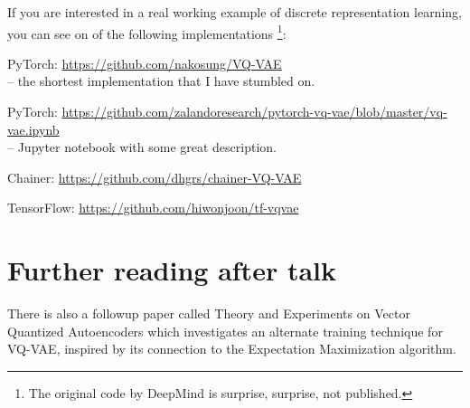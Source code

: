 \documentclass{article}
\begin{document}
If you are interested in a real working example of discrete representation learning, you can see on of the following implementations \footnote{The original code by DeepMind is surprise, surprise, not published.}:
\begin{description}
	\item{PyTorch:} \href{https://github.com/nakosung/VQ-VAE}{https://github.com/nakosung/VQ-VAE} \\-- the shortest implementation that I have stumbled on.
	\item{PyTorch:} \href{https://github.com/zalandoresearch/pytorch-vq-vae/blob/master/vq-vae.ipynb}{https://github.com/zalandoresearch/pytorch-vq-vae/blob/master/vq-vae.ipynb}\\-- Jupyter notebook with some great description.
	\item{Chainer:} \href{https://github.com/dhgrs/chainer-VQ-VAE}{https://github.com/dhgrs/chainer-VQ-VAE}
	\item{TensorFlow:} \href{https://github.com/hiwonjoon/tf-vqvae}{https://github.com/hiwonjoon/tf-vqvae}
\end{description}

\section{Further reading after talk}
There is also a followup paper called Theory and Experiments on Vector Quantized Autoencoders\cite{vaswani2017attention} which investigates an alternate training technique for VQ-VAE, inspired by its connection to the Expectation Maximization algorithm.

\clearpage
{}

\end{document}

